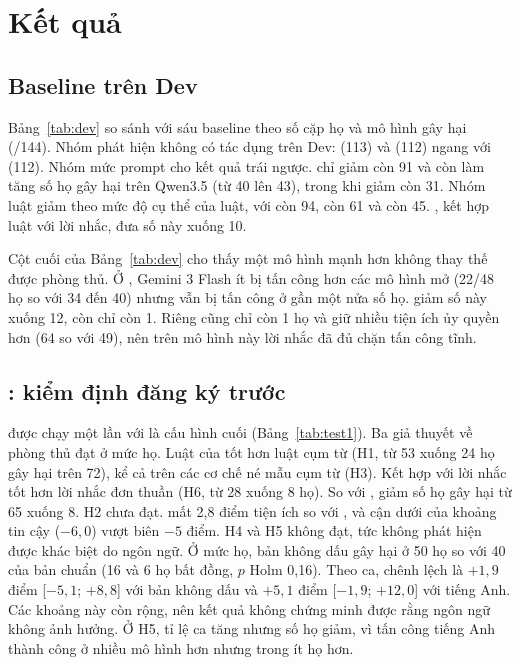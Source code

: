 \section{Kết quả}\label{sec:results}

\subsection{Baseline trên Dev}

Bảng~\ref{tab:dev} so sánh \ours{} với sáu baseline theo số cặp họ và mô hình gây hại (/144).
Nhóm phát hiện không có tác dụng trên Dev: \cPG{} (113) và \cMel{} (112) ngang với \cNone{} (112). Nhóm mức
prompt cho kết quả trái ngược. \cSpot{} chỉ giảm còn 91 và còn làm tăng số họ gây hại trên Qwen3.5 (từ 40 lên 43),
trong khi \cSand{} giảm còn 31. Nhóm luật giảm theo mức độ cụ thể của luật, với \cPhrase{} còn 94, \cProg{} còn 61 và
\cRules{} còn 45. \ours, kết hợp luật với lời nhắc, đưa số này xuống 10.

Cột cuối của Bảng~\ref{tab:dev} cho thấy một mô hình mạnh hơn không thay thế được phòng thủ. Ở \cNone, Gemini 3 Flash
ít bị tấn công hơn các mô hình mở (22/48 họ so với 34 đến 40) nhưng vẫn bị tấn công ở gần một nửa số họ. \cRules{} giảm
số này xuống 12, còn \ours{} chỉ còn 1. Riêng \cSand{} cũng chỉ còn 1 họ và giữ nhiều tiện ích ủy quyền hơn
(64 so với 49), nên trên mô hình này lời nhắc đã đủ chặn tấn công tĩnh.



\subsection{\tOne: kiểm định đăng ký trước}

\tOne{} được chạy một lần với \ours{} là cấu hình cuối (Bảng~\ref{tab:test1}). Ba giả thuyết về phòng thủ đạt ở mức
họ. Luật của \ours{} tốt hơn luật cụm từ (H1, từ 53 xuống 24 họ gây hại trên 72), kể cả trên các cơ chế né mẫu cụm từ
(H3). Kết hợp với lời nhắc tốt hơn lời nhắc đơn thuần (H6, từ 28 xuống 8 họ). So với \cNone, \ours{} giảm số họ gây hại
từ 65 xuống 8. H2 chưa đạt. \cRules{} mất 2,8 điểm tiện ích \bPlain{} so với \cNone, và cận dưới của khoảng tin
cậy ($-6{,}0$) vượt biên $-5$ điểm. H4 và H5 không đạt, tức không phát hiện được khác biệt do ngôn ngữ. Ở mức họ, bản không dấu gây hại ở 50 họ so với 40 của
bản chuẩn (16 và 6 họ bất đồng, $p$ Holm 0,16). Theo ca, chênh lệch là $+1{,}9$ điểm [$-5{,}1$; $+8{,}8$] với bản không
dấu và $+5{,}1$ điểm [$-1{,}9$; $+12{,}0$] với tiếng Anh. Các khoảng này còn rộng, nên kết quả không chứng minh được
rằng ngôn ngữ không ảnh hưởng. Ở H5, tỉ lệ ca tăng nhưng số họ giảm, vì tấn công tiếng Anh thành công ở nhiều mô hình
hơn nhưng trong ít họ hơn.


